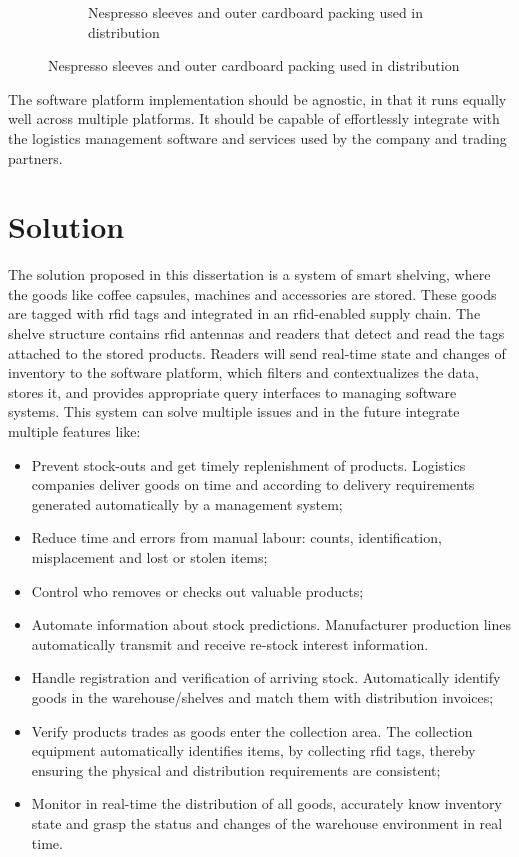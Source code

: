 \begin{figure}
\begin{subfigure}{.45\textwidth}
        \caption{Nespresso sleeves and outer cardboard packing used in distribution} 
        \label{fig:sleevepacking}
    \end{subfigure}
    \label{fig:sleeves}
\end{figure}

The software platform implementation should be agnostic, in that it runs equally well across multiple platforms. It should be capable of effortlessly integrate with the logistics management software and services used by the company and trading partners.

\section{Solution}

The solution proposed in this dissertation is a system of smart shelving, where the goods like coffee capsules, machines and accessories are stored. These goods are tagged with \ac{rfid} tags and integrated in an \ac{rfid}-enabled supply chain.
The shelve structure contains \ac{rfid} antennas and readers that detect and read the tags attached to the stored products. Readers will send real-time state and changes of inventory to the software platform, which filters and contextualizes the data, stores it, and provides appropriate query interfaces to managing software systems.
This system can solve multiple issues and in the future integrate multiple features like:

\begin{itemize}
    \item Prevent stock-outs and get timely replenishment of products. Logistics companies deliver goods on time and according to delivery requirements generated automatically by a management system;
    \item Reduce time and errors from manual labour: counts, identification, misplacement and lost or stolen items;
    \item Control who removes or checks out valuable products;
    \item Automate information about stock predictions. Manufacturer production lines automatically transmit and receive re-stock interest information.
    \item Handle registration and verification of arriving stock. Automatically identify goods in the warehouse/shelves and match them with distribution invoices;
    \item Verify products trades as goods enter the collection area. The collection equipment automatically identifies items, by collecting \ac{rfid} tags, thereby ensuring the physical and  distribution requirements are consistent;
    \item Monitor in real-time the distribution of all goods, accurately know inventory state and grasp the status and changes of the warehouse environment in real time.
\end{itemize}

